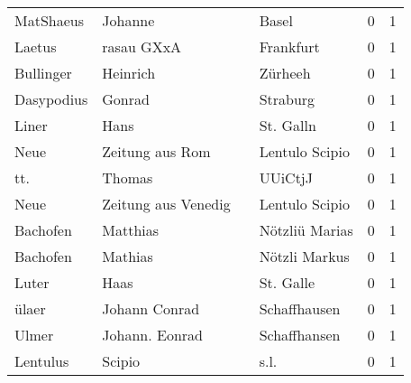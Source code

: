 \begin{tabular}{llllrr}
                MatShaeus &                            Johanne &             &                                       Basel &          0 &         1 \\
                   Laetus &                         rasau GXxA &             &                                   Frankfurt &          0 &         1 \\
                Bullinger &                           Heinrich &             &                                     Zürheeh &          0 &         1 \\
               Dasypodius &                             Gonrad &             &                                    Straburg &          0 &         1 \\
                    Liner &                               Hans &             &                                   St. Galln &          0 &         1 \\
                     Neue &                    Zeitung aus Rom &             &                              Lentulo Scipio &          0 &         1 \\
                      tt. &                             Thomas &             &                                     UUiCtjJ &          0 &         1 \\
                     Neue &                Zeitung aus Venedig &             &                              Lentulo Scipio &          0 &         1 \\
                 Bachofen &                           Matthias &             &                              Nötzliü Marias &          0 &         1 \\
                 Bachofen &                            Mathias &             &                               Nötzli Markus &          0 &         1 \\
                    Luter &                               Haas &             &                                   St. Galle &          0 &         1 \\
                    ülaer &                      Johann Conrad &             &                                Schaffhausen &          0 &         1 \\
                    Ulmer &                     Johann. Eonrad &             &                                Schaffhansen &          0 &         1 \\
                 Lentulus &                             Scipio &             &                                        s.l. &          0 &         1 \\

\end{tabular}
